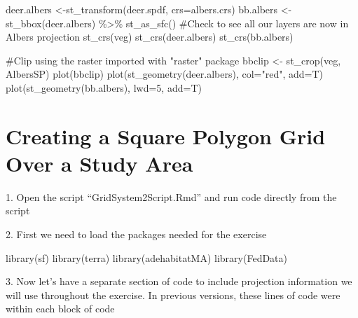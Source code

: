 \documentclass[
  letterpaper,
]{book}
\newenvironment{Shaded}{\begin{snugshade}}{\end{snugshade}}
\newcommand{\AttributeTok}[1]{\textcolor[rgb]{0.40,0.45,0.13}{#1}}
\newcommand{\CommentTok}[1]{\textcolor[rgb]{0.37,0.37,0.37}{#1}}
\newcommand{\DecValTok}[1]{\textcolor[rgb]{0.68,0.00,0.00}{#1}}
\newcommand{\FunctionTok}[1]{\textcolor[rgb]{0.28,0.35,0.67}{#1}}
\newcommand{\NormalTok}[1]{\textcolor[rgb]{0.00,0.23,0.31}{#1}}
\newcommand{\OtherTok}[1]{\textcolor[rgb]{0.00,0.23,0.31}{#1}}
\newcommand{\SpecialCharTok}[1]{\textcolor[rgb]{0.37,0.37,0.37}{#1}}
\newcommand{\StringTok}[1]{\textcolor[rgb]{0.13,0.47,0.30}{#1}}
\begin{document}
\begin{Shaded}
\begin{Highlighting}[]
\NormalTok{deer.albers }\OtherTok{\textless{}{-}}\FunctionTok{st\_transform}\NormalTok{(deer.spdf, }\AttributeTok{crs=}\NormalTok{albers.crs)}
\NormalTok{bb.albers }\OtherTok{\textless{}{-}} \FunctionTok{st\_bbox}\NormalTok{(deer.albers) }\SpecialCharTok{\%\textgreater{}\%} \FunctionTok{st\_as\_sfc}\NormalTok{()}
\CommentTok{\#Check to see all our layers are now in Albers projection}
\FunctionTok{st\_crs}\NormalTok{(veg)}
\FunctionTok{st\_crs}\NormalTok{(deer.albers)}
\FunctionTok{st\_crs}\NormalTok{(bb.albers)}

\CommentTok{\#Clip using the raster imported with "raster" package }
\NormalTok{bbclip }\OtherTok{\textless{}{-}} \FunctionTok{st\_crop}\NormalTok{(veg, AlbersSP)}
\FunctionTok{plot}\NormalTok{(bbclip)}
\FunctionTok{plot}\NormalTok{(}\FunctionTok{st\_geometry}\NormalTok{(deer.albers), }\AttributeTok{col=}\StringTok{"red"}\NormalTok{, }\AttributeTok{add=}\NormalTok{T)}
\FunctionTok{plot}\NormalTok{(}\FunctionTok{st\_geometry}\NormalTok{(bb.albers), }\AttributeTok{lwd=}\DecValTok{5}\NormalTok{, }\AttributeTok{add=}\NormalTok{T)}
\end{Highlighting}
\end{Shaded}

\hypertarget{creating-a-square-polygon-grid-over-a-study-area}{%
\chapter{Creating a Square Polygon Grid Over a Study
Area}\label{creating-a-square-polygon-grid-over-a-study-area}}

1. Open the script ``GridSystem2Script.Rmd'' and run code directly from
the script

2. First we need to load the packages needed for the exercise

\begin{Shaded}
\begin{Highlighting}[]
\FunctionTok{library}\NormalTok{(sf)}
\FunctionTok{library}\NormalTok{(terra)}
\FunctionTok{library}\NormalTok{(adehabitatMA)}
\FunctionTok{library}\NormalTok{(FedData)}
\end{Highlighting}
\end{Shaded}

3. Now let's have a separate section of code to include projection
information we will use throughout the exercise. In previous versions,
these lines of code were within each block of code
\end{document}
